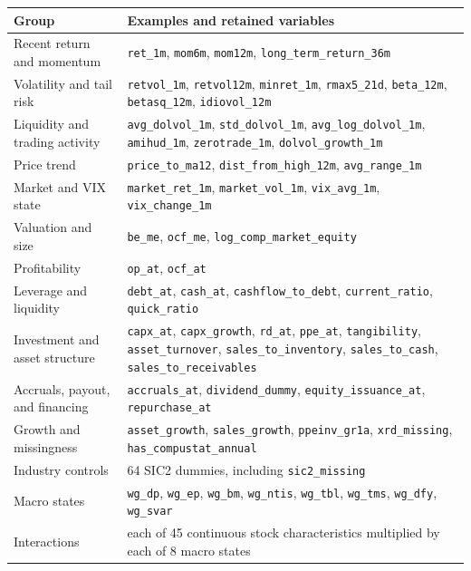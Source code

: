 \documentclass[11pt,a4paper]{article}
\newcommand{\code}[1]{\texttt{#1}}
\begin{document}
\begin{center}
\begin{tabularx}{\textwidth}{p{3.8cm}Y}
\toprule
Group & Examples and retained variables \\
\midrule
Recent return and momentum & \code{ret\_1m}, \code{mom6m}, \code{mom12m}, \code{long\_term\_return\_36m} \\
Volatility and tail risk & \code{retvol\_1m}, \code{retvol12m}, \code{minret\_1m}, \code{rmax5\_21d}, \code{beta\_12m}, \code{betasq\_12m}, \code{idiovol\_12m} \\
Liquidity and trading activity & \code{avg\_dolvol\_1m}, \code{std\_dolvol\_1m}, \code{avg\_log\_dolvol\_1m}, \code{amihud\_1m}, \code{zerotrade\_1m}, \code{dolvol\_growth\_1m} \\
Price trend & \code{price\_to\_ma12}, \code{dist\_from\_high\_12m}, \code{avg\_range\_1m} \\
Market and VIX state & \code{market\_ret\_1m}, \code{market\_vol\_1m}, \code{vix\_avg\_1m}, \code{vix\_change\_1m} \\
Valuation and size & \code{be\_me}, \code{ocf\_me}, \code{log\_comp\_market\_equity} \\
Profitability & \code{op\_at}, \code{ocf\_at} \\
Leverage and liquidity & \code{debt\_at}, \code{cash\_at}, \code{cashflow\_to\_debt}, \code{current\_ratio}, \code{quick\_ratio} \\
Investment and asset structure & \code{capx\_at}, \code{capx\_growth}, \code{rd\_at}, \code{ppe\_at}, \code{tangibility}, \code{asset\_turnover}, \code{sales\_to\_inventory}, \code{sales\_to\_cash}, \code{sales\_to\_receivables} \\
Accruals, payout, and financing & \code{accruals\_at}, \code{dividend\_dummy}, \code{equity\_issuance\_at}, \code{repurchase\_at} \\
Growth and missingness & \code{asset\_growth}, \code{sales\_growth}, \code{ppeinv\_gr1a}, \code{xrd\_missing}, \code{has\_compustat\_annual} \\
Industry controls & 64 SIC2 dummies, including \code{sic2\_missing} \\
Macro states & \code{wg\_dp}, \code{wg\_ep}, \code{wg\_bm}, \code{wg\_ntis}, \code{wg\_tbl}, \code{wg\_tms}, \code{wg\_dfy}, \code{wg\_svar} \\
Interactions & each of 45 continuous stock characteristics multiplied by each of 8 macro states \\
\bottomrule
\end{tabularx}
\end{center}
\end{document}
